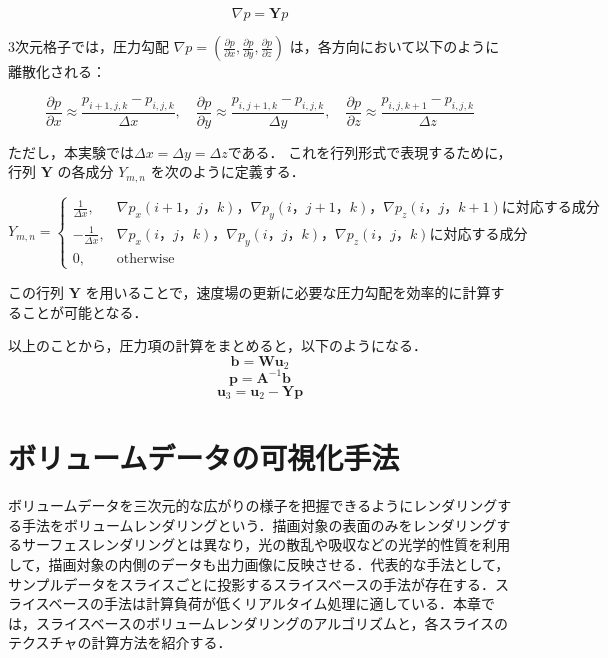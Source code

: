 \documentclass[a4j,12pt]{jreport}
\begin{document}
\begin{equation}
\nabla p = \bm{Y} p
\end{equation}

3次元格子では，圧力勾配 $\nabla p = (\frac{\partial p}{\partial x}, \frac{\partial p}{\partial y}, \frac{\partial p}{\partial z})$ は，各方向において以下のように離散化される：

\begin{equation}
\frac{\partial p}{\partial x} \approx \frac{p_{i+1,j,k} - p_{i,j,k}}{\Delta x}, \quad
\frac{\partial p}{\partial y} \approx \frac{p_{i,j+1,k} - p_{i,j,k}}{\Delta y}, \quad
\frac{\partial p}{\partial z} \approx \frac{p_{i,j,k+1} - p_{i,j,k}}{\Delta z}
\end{equation}

ただし，本実験では$\varDelta x = \varDelta y= \varDelta z$である．
これを行列形式で表現するために，行列 $\bm{Y}$ の各成分 $Y_{m,n}$ を次のように定義する．

\[
Y_{m,n} =
\begin{cases}
\frac{1}{\varDelta x}, &  \nabla p_x(i+1，j，k)，\nabla p_y(i，j+1，k)，\nabla p_z(i，j，k+1)に対応する成分 \\
-\frac{1}{\varDelta x}, &  \nabla p_x(i，j，k)， \nabla p_y(i，j，k)， \nabla p_z(i，j，k)に対応する成分\\
0, & \text{otherwise}
\end{cases}
\]

この行列 $\bm{Y}$ を用いることで，速度場の更新に必要な圧力勾配を効率的に計算することが可能となる．%


以上のことから，圧力項の計算をまとめると，以下のようになる．
\[
	\bm{b} = \bm{W}\bm{u}_2
\]
\[
	\bm{p} = \bm{A}^{-1}\bm{b}
\]
\[
	\bm{u}_3  =  \bm{u}_2 - \bm{Y}\bm{p} 
\]

\section{ボリュームデータの可視化手法}
ボリュームデータを三次元的な広がりの様子を把握できるようにレンダリングする手法をボリュームレンダリングという．描画対象の表面のみをレンダリングするサーフェスレンダリングとは異なり，光の散乱や吸収などの光学的性質を利用して，描画対象の内側のデータも出力画像に反映させる．代表的な手法として，サンプルデータをスライスごとに投影するスライスベースの手法が存在する．スライスベースの手法は計算負荷が低くリアルタイム処理に適している．本章では，スライスベースのボリュームレンダリングのアルゴリズムと，各スライスのテクスチャの計算方法を紹介する．
\end{document}
